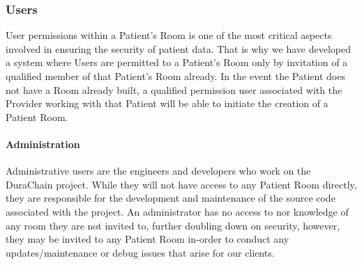 \documentclass[letterpaper]{article}
\begin{document}
  \subsubsection{Users}
  User permissions within a Patient’s Room is one of the most critical aspects involved in ensuring the security of patient data. That is why we have developed a system where Users are permitted to a Patient’s Room only by invitation of a qualified member of that Patient’s Room already. In the event the Patient does not have a Room already built, a qualified permission user associated with the Provider working with that Patient will be able to initiate the creation of a Patient Room.
%
  \paragraph{Administration}
  Administrative users are the engineers and developers who work on the DuraChain project. While they will not have access to any Patient Room directly, they are responsible for the development and maintenance of the source code associated with the project. An administrator has no access to nor knowledge of any room they are not invited to, further doubling down on security, however, they may be invited to any Patient Room in-order to conduct any updates/maintenance or debug issues that arise for our clients.
%
%
%
\end{document}
